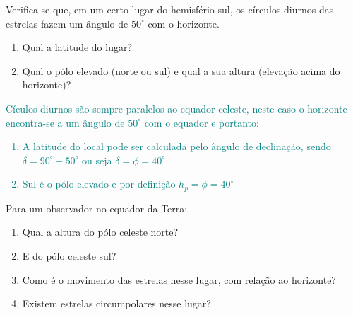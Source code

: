 \begin{prob}
	Verifica-se que, em um certo lugar do hemisfério sul, os círculos diurnos das estrelas fazem um
	ângulo de $50^{\circ}$ com o horizonte.
	\begin{enumerate}[label=\alph *)]
		\item Qual a latitude do lugar?
		\item Qual o pólo elevado (norte ou sul) e qual a sua altura (elevação acima do horizonte)?
	\end{enumerate}
\end{prob}

\begin{sol}
	\textcolor{teal} {
		Cículos diurnos são sempre paralelos ao equador celeste, neste caso o horizonte encontra-se a um ângulo de $50^{\circ}$ com o equador e portanto:
		\begin{enumerate}[label=\alph *)]
			\item A latitude do local pode ser calculada pelo ângulo de declinação, sendo $\delta=90^{\circ}-50^{\circ}$ ou seja $\delta=\phi=40^{\circ}$
			\item Sul é o pólo elevado e por definição $h_p=\phi=40^{\circ}$
		\end{enumerate}
	}
\end{sol}
\begin{prob}
	Para um observador no equador da Terra:
	\begin{enumerate}[label=\alph *)]
		\item Qual a altura do pólo celeste norte?
		\item E do pólo celeste sul?
		\item Como é o movimento das estrelas nesse lugar, com relação ao horizonte?
		\item Existem estrelas circumpolares nesse lugar?
	\end{enumerate}
\end{prob}


